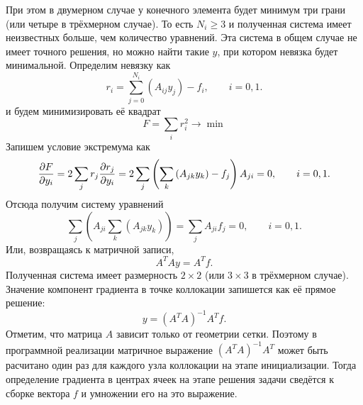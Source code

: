 При этом в двумерном случае у конечного элемента будет минимум три грани (или четыре в трёхмерном случае). То есть $N_i \geq 3$ 
и полученная система имеет неизвестных больше, чем количество уравнений.
Эта система в общем случае не имеет точного решения,
но можно найти такие $y$, при котором невязка будет минимальной.
Определим невязку как 
$$
r_i = \sum_{j=0}^{N_i}\left(A_{ij}y_j\right) - f_i, \qquad i=0, 1.
$$
и будем минимизировать её квадрат
$$
F = \sum_i r_i^2 \to \min
$$
Запишем условие экстремума как
$$
\frac{\partial F}{\partial y_i} = 2 \sum_j r_j \frac{\partial r_j}{\partial y_i} =
               2 \sum_j \left( \sum_k \left( A_{jk} y_k\right) - f_j \right)A_{ji} = 0, \qquad i=0,1.
$$
Отсюда получим систему уравнений
$$
\sum_j \left( A_{ji} \sum_k \left( A_{jk} y_k\right) \right) = \sum_j A_{ji}f_j = 0, \qquad i=0,1.
$$
Или, возвращаясь к матричной записи,
$$
A^{T} A y = A^{T}f.
$$
Полученная система имеет размерность $2\times2$ (или $3\times3$ в трёхмерном случае).
Значение компонент градиента в точке коллокации запишется как её прямое решение:
$$
y = \left(A^T A\right)^{-1} A^T f.
$$
Отметим, что матрица $A$ зависит только от геометрии сетки.
Поэтому в программной реализации матричное выражение $\left(A^T A\right)^{-1} A^T $ может быть расчитано 
один раз для каждого узла коллокации на этапе инициализации.
Тогда определение градиента в центрах ячеек на этапе решения задачи 
сведётся к сборке вектора $f$ и умножении его на это выражение.
